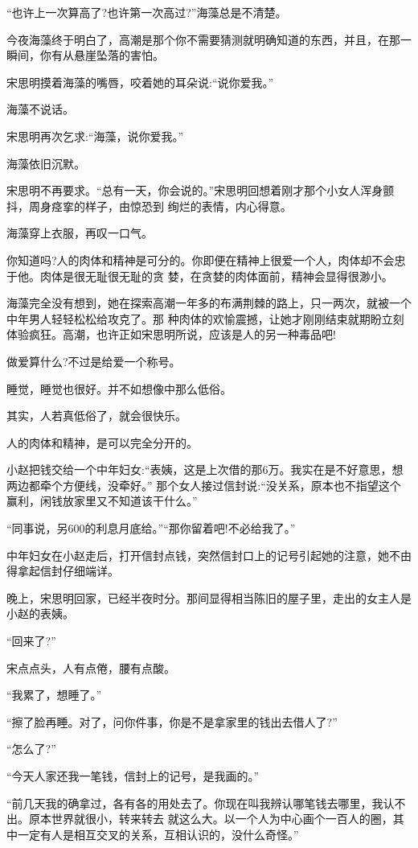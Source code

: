 \documentclass[11pt,a4paper,onecolumn]{article}
\begin{document}
``也许上一次算高了?也许第一次高过?''海藻总是不清楚。

今夜海藻终于明白了，高潮是那个你不需要猜测就明确知道的东西，并且，在那一瞬间，你有从悬崖坠落的害怕。

宋思明摸着海藻的嘴唇，咬着她的耳朵说:``说你爱我。''

海藻不说话。

宋思明再次乞求:``海藻，说你爱我。''

海藻依旧沉默。

宋思明不再要求。``总有一天，你会说的。''宋思明回想着刚才那个小女人浑身颤抖，周身痉挛的样子，由惊恐到
绚烂的表情，内心得意。

海藻穿上衣服，再叹一口气。

你知道吗?人的肉体和精神是可分的。你即便在精神上很爱一个人，肉体却不会忠于他。肉体是很无耻很无耻的贪
婪，在贪婪的肉体面前，精神会显得很渺小。

海藻完全没有想到，她在探索高潮一年多的布满荆棘的路上，只一两次，就被一个中年男人轻轻松松给攻克了。那
种肉体的欢愉震撼，让她才刚刚结束就期盼立刻体验疯狂。高潮，也许正如宋思明所说，应该是人的另一种毒品吧!

做爱算什么?不过是给爱一个称号。

睡觉，睡觉也很好。并不如想像中那么低俗。

其实，人若真低俗了，就会很快乐。

人的肉体和精神，是可以完全分开的。

小赵把钱交给一个中年妇女:``表姨，这是上次借的那6万。我实在是不好意思，想两边都牵个方便线，没牵好。''
那个女人接过信封说:``没关系，原本也不指望这个赢利，闲钱放家里又不知道该干什么。''

``同事说，另600的利息月底给。''``那你留着吧!不必给我了。''

中年妇女在小赵走后，打开信封点钱，突然信封口上的记号引起她的注意，她不由得拿起信封仔细端详。

晚上，宋思明回家，已经半夜时分。那间显得相当陈旧的屋子里，走出的女主人是小赵的表姨。

``回来了?''

宋点点头，人有点倦，腰有点酸。

``我累了，想睡了。''

``擦了脸再睡。对了，问你件事，你是不是拿家里的钱出去借人了?''

``怎么了?''

``今天人家还我一笔钱，信封上的记号，是我画的。''

``前几天我的确拿过，各有各的用处去了。你现在叫我辨认哪笔钱去哪里，我认不出。原本世界就很小，转来转去
就这么大。以一个人为中心画个一百人的圈，其中一定有人是相互交叉的关系，互相认识的，没什么奇怪。''
\end{document}
